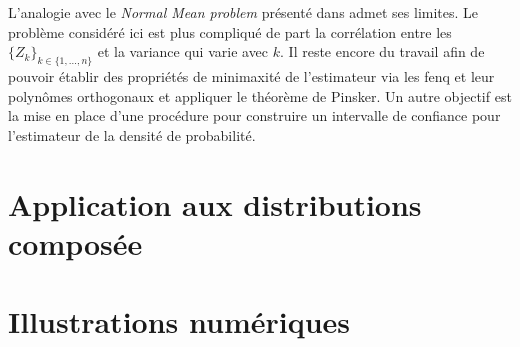 L'analogie avec le \textit{Normal Mean problem} présenté dans \cite{Wa06} admet ses limites. Le problème considéré ici est plus compliqué de part la corrélation entre les $\{Z_{k}\}_{k\in\{1,\ldots,n\}}$ et la variance qui varie avec $k$. Il reste encore du travail afin de pouvoir établir des propriétés de minimaxité de l\rq{}estimateur via les \gls{fenq} et leur polynômes orthogonaux et appliquer le théorème de Pinsker. Un autre objectif est la mise en place d\rq{}une procédure pour construire un intervalle de confiance pour l\rq{}estimateur de la densité de probabilité.
\section{Application aux distributions composée}
\section{Illustrations numériques}




